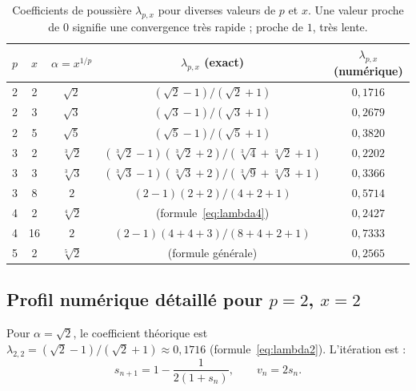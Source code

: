 \documentclass[11pt,a4paper]{article}
\theoremstyle{definition}
\newcommand{\cbrt}[1]{\sqrt[3]{#1}}
\begin{document}
\begin{table}[h]
\centering
\begin{tabular}{ccccc}
\toprule
$p$ & $x$ & $\alpha = x^{1/p}$ & $\lambda_{p,x}$ (exact) & $\lambda_{p,x}$ (numérique) \\
\midrule
2 & 2 & $\sqrt{2}$ & $(\sqrt{2}-1)/(\sqrt{2}+1)$ & $0{,}1716$ \\
2 & 3 & $\sqrt{3}$ & $(\sqrt{3}-1)/(\sqrt{3}+1)$ & $0{,}2679$ \\
2 & 5 & $\sqrt{5}$ & $(\sqrt{5}-1)/(\sqrt{5}+1)$ & $0{,}3820$ \\
\midrule
3 & 2 & $\cbrt{2}$ & $(\cbrt{2}-1)(\cbrt{2}+2)/(\cbrt{4}+\cbrt{2}+1)$ & $0{,}2202$ \\
3 & 3 & $\cbrt{3}$ & $(\cbrt{3}-1)(\cbrt{3}+2)/(\cbrt{9}+\cbrt{3}+1)$ & $0{,}3366$ \\
3 & 8 & $2$ & $(2-1)(2+2)/(4+2+1)$ & $0{,}5714$ \\
\midrule
4 & 2 & $\sqrt[4]{2}$ & (formule~\eqref{eq:lambda4}) & $0{,}2427$ \\
4 & 16 & $2$ & $(2-1)(4+4+3)/(8+4+2+1)$ & $0{,}7333$ \\
\midrule
5 & 2 & $\sqrt[5]{2}$ & (formule générale) & $0{,}2565$ \\
\bottomrule
\end{tabular}
\caption{Coefficients de poussière $\lambda_{p,x}$ pour diverses valeurs de $p$ et $x$. Une valeur proche de $0$ signifie une convergence très rapide ; proche de $1$, très lente.}
\end{table}

\subsection{Profil numérique détaillé pour \texorpdfstring{$p=2$, $x=2$}{p=2, x=2}}

Pour $\alpha = \sqrt{2}$, le coefficient théorique est $\lambda_{2,2} = (\sqrt{2}-1)/(\sqrt{2}+1) \approx 0{,}1716$ (formule~\eqref{eq:lambda2}). L'itération est :
\[
  s_{n+1} = 1 - \frac{1}{2(1 + s_n)}, \qquad v_n = 2s_n.
\]
\end{document}
